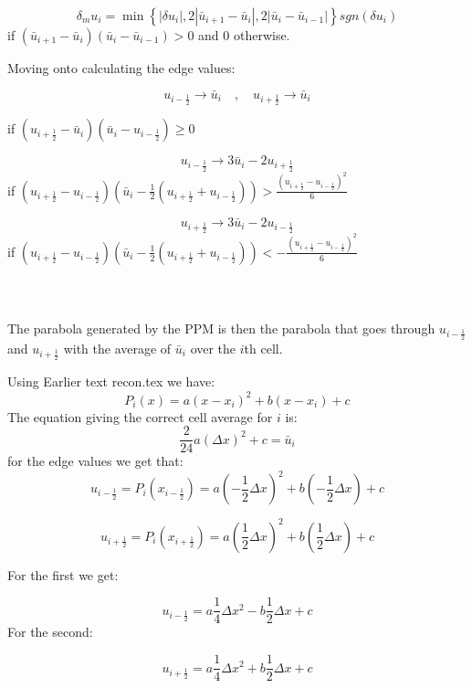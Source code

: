 \documentclass[12pt]{article}
\begin{document}
\[\delta_m u_i = \min\left\lbrace |\delta u_i|, 2|\bar{u}_{i+1} - \bar{u}_{i}|, 2|\bar{u}_{i} - \bar{u}_{i-1}| \right\rbrace sgn\left(\delta u_i\right) \]
if $(\bar{u}_{i+1} - \bar{u}_{i})(\bar{u}_{i} - \bar{u}_{i-1}) > 0$ and $0$ otherwise.

Moving onto calculating the edge values:

\[u_{i - \frac{1}{2}} \rightarrow \bar{u}_i \quad , \quad u_{i + \frac{1}{2}} \rightarrow \bar{u}_i \]

if $(u_{i + \frac{1}{2}} - \bar{u}_i)(\bar{u}_i - u_{i - \frac{1}{2}}) \ge 0$

\[u_{i - \frac{1}{2}} \rightarrow 3\bar{u}_i - 2u_{i + \frac{1}{2}}\]
if $\left(u_{i + \frac{1}{2}} -u_{i - \frac{1}{2}}\right)\left(\bar{u}_i - \frac{1}{2} \left(u_{i + \frac{1}{2}} + u_{i - \frac{1}{2}}\right)\right) > \frac{\left(u_{i + \frac{1}{2}} -u_{i - \frac{1}{2}}\right)^2}{6}$

\[u_{i + \frac{1}{2}} \rightarrow 3\bar{u}_i - 2u_{i - \frac{1}{2}}\]
if $\left(u_{i + \frac{1}{2}} -u_{i - \frac{1}{2}}\right)\left(\bar{u}_i - \frac{1}{2} \left(u_{i + \frac{1}{2}} + u_{i - \frac{1}{2}}\right)\right) < - \frac{\left(u_{i + \frac{1}{2}} -u_{i - \frac{1}{2}}\right)^2}{6}$ \\ \\ \\ \\
The parabola generated by the PPM is then the parabola that goes through $u_{i-\frac{1}{2}}$ and $u_{i+\frac{1}{2}}$ with the average of $\bar{u}_i$ over the $i$th cell.

Using Earlier text recon.tex we have:
\[P_i(x) = a(x-x_i)^2 + b(x-x_i) +c \]
The equation giving the correct cell average for $i$ is:
\begin{dmath}
\label{ciint}
\frac{2}{24}a(\Delta x)^2 + c =\bar{u}_i 
\end{dmath}
for the edge values we get that:
\[u_{i - \frac{1}{2}} =P_i(x_{i-\frac{1}{2}}) = a\left(-\frac{1}{2}\Delta x\right)^2 + b\left(-\frac{1}{2}\Delta x\right) +c  \]

\[u_{i + \frac{1}{2}} =P_i(x_{i+\frac{1}{2}}) = a\left(\frac{1}{2}\Delta x\right)^2 + b\left(\frac{1}{2}\Delta x\right) +c  \]

For the first we get:

\[u_{i - \frac{1}{2}} = a\frac{1}{4}\Delta x^2 - b\frac{1}{2}\Delta x +c  \]
For the second:

\[u_{i + \frac{1}{2}} = a\frac{1}{4}\Delta x^2 + b\frac{1}{2}\Delta x +c  \]
\end{document}
